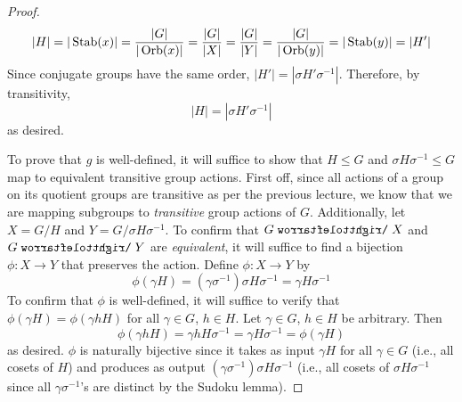 \documentclass[../notes.tex]{subfiles}
\begin{document}
\begin{itemize}
\begin{proof}
\begin{equation*}
            |H| = |\operatorname{Stab}(x)|
            = \frac{|G|}{|\operatorname{Orb}(x)|}
            = \frac{|G|}{|X|}
            = \frac{|G|}{|Y|}
            = \frac{|G|}{|\operatorname{Orb}(y)|}
            = |\operatorname{Stab}(y)|
            = |H'|
        \end{equation*}
        Since conjugate groups have the same order, $|H'|=|\sigma H'\sigma^{-1}|$. Therefore, by transitivity,
        \begin{equation*}
            |H| = |\sigma H'\sigma^{-1}|
        \end{equation*}
        as desired.\par
        To prove that $g$ is well-defined, it will suffice to show that $H\leq G$ and $\sigma H\sigma^{-1}\leq G$ map to equivalent transitive group actions. First off, since all actions of a group on its quotient groups are transitive as per the previous lecture, we know that we are mapping subgroups to \emph{transitive} group actions of $G$. Additionally, let $X=G/H$ and $Y=G/\sigma H\sigma^{-1}$. To confirm that $G\acts X$ and $G\acts Y$ are \emph{equivalent}, it will suffice to find a bijection $\phi:X\to Y$ that preserves the action. Define $\phi:X\to Y$ by
        \begin{equation*}
            \phi(\gamma H) = (\gamma\sigma^{-1})\sigma H\sigma^{-1} = \gamma H\sigma^{-1}
        \end{equation*}
        To confirm that $\phi$ is well-defined, it will suffice to verify that $\phi(\gamma H)=\phi(\gamma hH)$ for all $\gamma\in G$, $h\in H$. Let $\gamma\in G$, $h\in H$ be arbitrary. Then
        \begin{equation*}
            \phi(\gamma hH) = \gamma hH\sigma^{-1}
            = \gamma H\sigma^{-1}
            = \phi(\gamma H)
        \end{equation*}
        as desired.
        $\phi$ is naturally bijective since it takes as input $\gamma H$ for all $\gamma\in G$ (i.e., all cosets of $H$) and produces as output $(\gamma\sigma^{-1})\sigma H\sigma^{-1}$ (i.e., all cosets of $\sigma H\sigma^{-1}$ since all $\gamma\sigma^{-1}$'s are distinct by the Sudoku lemma).

\end{proof}
\end{itemize}
\end{document}
